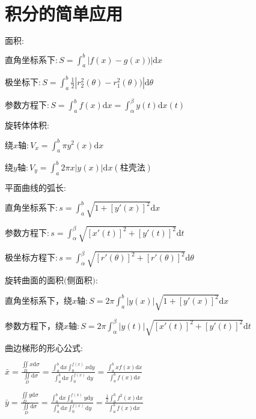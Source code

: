 \section{积分的简单应用}

\begin{spacing}{\hangju}
    \noindent $\mbox{面积}\colon$

    $\mbox{直角坐标系下}\colon S = \int_{a}^{b}{|f(x) - g(x))|\mathrm{d}x}$

    $\mbox{极坐标下}\colon S = \int_{a}^{b}{\frac{1}{2}|r_{2}^{2}(\theta) - r_{1}^{2}(\theta))|\mathrm{d}\theta}$

    $\mbox{参数方程下}\colon S = \int_{a}^{b}{f(x)\mathrm{d}x} =\int_{\alpha}^{\beta}{y(t)\mathrm{d}x(t)}$

    \noindent $\mbox{旋转体体积}\colon$

    $\mbox{绕}x\mbox{轴}\colon V_{x} = \int_{a}^{b}{\pi y^2(x)\mathrm{d}x}$

    $\mbox{绕}y\mbox{轴}\colon V_{y} = \int_{a}^{b}{2\pi x|y(x)|\mathrm{d}x}(\mbox{柱壳法})$

    \noindent $\mbox{平面曲线的弧长}\colon$

    $\mbox{直角坐标系下}\colon s = \int_{a}^{b}{\sqrt{1 + [y'(x)]^2}\mathrm{d}x}$

    $\mbox{参数方程下}\colon s = \int_{\alpha}^{\beta}{\sqrt{[x'(t)]^2 + [y'(t)]^2}\mathrm{d}t}$

    $\mbox{极坐标方程下}\colon s = \int_{\alpha}^{\beta}{\sqrt{[r'(\theta)]^2 + [r'(\theta)]^2}\mathrm{d}\theta}$

    \noindent $\mbox{旋转曲面的面积(侧面积)}\colon$

    $\mbox{直角坐标系下，绕}x\mbox{轴}\colon S = 2\pi\int_{a}^{b}{|y(x)|\sqrt{1 + [y'(x)]^2}\mathrm{d}x}$

    $\mbox{参数方程下，绕}x\mbox{轴}\colon S = 2\pi\int_{\alpha}^{\beta}{|y(t)|\sqrt{[x'(t)]^2 + [y'(t)]^2}\mathrm{d}t}$

    \noindent $\mbox{曲边梯形的形心公式}\colon$

    $\bar{x} = \frac{\iint\limits_D{x\mathrm{d}\sigma}}{\iint\limits_D{\mathrm{d}\sigma}} = \frac{\int_{a}^{b}{\mathrm{d}x}\int_{0}^{f(x)}{x\mathrm{d}y}}{\int_{a}^{b}{\mathrm{d}x}\int_{0}^{f(x)}{\mathrm{d}y}} = \frac{\int_{a}^{b}{xf(x)\mathrm{d}x}}{\int_{a}^{b}{f(x)\mathrm{d}x}}$

    $\bar{y} = \frac{\iint\limits_D{y\mathrm{d}\sigma}}{\iint\limits_D{\mathrm{d}\sigma}} = \frac{\int_{a}^{b}{\mathrm{d}x}\int_{0}^{f(x)}{y\mathrm{d}y}}{\int_{a}^{b}{\mathrm{d}x}\int_{0}^{f(x)}{\mathrm{d}y}} = \frac{\frac{1}{2}\int_{a}^{b}{f^{2}(x)\mathrm{d}x}}{\int_{a}^{b}{f(x)\mathrm{d}x}}$


\end{spacing}
